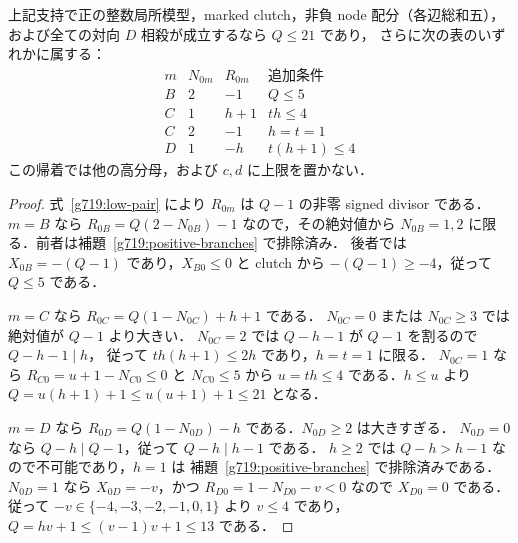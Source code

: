 \begin{proposition}[葉分母と配置の完全な有限帰着]
\label{g719:leaf-bound}
上記支持で正の整数局所模型，marked clutch，非負 node 配分（各辺総和五），
および全ての対向 $D$ 相殺が成立するなら $Q\le21$ であり，
さらに次の表のいずれかに属する：
\[
\begin{array}{c|c|c|c}
 m&N_{0m}&R_{0m}&\text{追加条件}\\\hline
 B&2&-1&Q\le5\\
 C&1&h+1&th\le4\\
 C&2&-1&h=t=1\\
 D&1&-h&t(h+1)\le4
\end{array}
\]
この帰着では他の高分母，および $c,d$ に上限を置かない．
\end{proposition}
\begin{proof}
式~\eqref{g719:low-pair} により $R_{0m}$ は $Q-1$ の非零 signed divisor である．
$m=B$ なら $R_{0B}=Q(2-N_{0B})-1$ なので，その絶対値から
$N_{0B}=1,2$ に限る．前者は補題~\ref{g719:positive-branches} で排除済み．
後者では $X_{0B}=-(Q-1)$ であり，$X_{B0}\le0$ と clutch から
$-(Q-1)\ge-4$，従って $Q\le5$ である．

$m=C$ なら $R_{0C}=Q(1-N_{0C})+h+1$ である．
$N_{0C}=0$ または $N_{0C}\ge3$ では絶対値が $Q-1$ より大きい．
$N_{0C}=2$ では $Q-h-1$ が $Q-1$ を割るので $Q-h-1\mid h$，
従って $th(h+1)\le2h$ であり，$h=t=1$ に限る．
$N_{0C}=1$ なら $R_{C0}=u+1-N_{C0}\le0$ と $N_{C0}\le5$ から
$u=th\le4$ である．$h\le u$ より
$Q=u(h+1)+1\le u(u+1)+1\le21$ となる．

$m=D$ なら $R_{0D}=Q(1-N_{0D})-h$ である．$N_{0D}\ge2$ は大きすぎる．
$N_{0D}=0$ なら $Q-h\mid Q-1$，従って $Q-h\mid h-1$ である．
$h\ge2$ では $Q-h>h-1$ なので不可能であり，$h=1$ は
補題~\ref{g719:positive-branches} で排除済みである．
$N_{0D}=1$ なら $X_{0D}=-v$，かつ
$R_{D0}=1-N_{D0}-v<0$ なので $X_{D0}=0$ である．
従って $-v\in\{-4,-3,-2,-1,0,1\}$ より $v\le4$ であり，
$Q=hv+1\le(v-1)v+1\le13$ である．
\end{proof}

